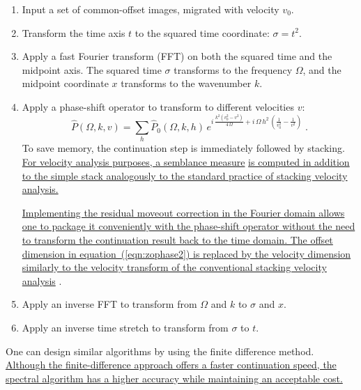 \begin{enumerate}
  \item Input a set of common-offset images, migrated with velocity $v_0$.
  \item Transform the time axis $t$ to the squared time coordinate:
    $\sigma=t^2$.
  \item Apply a fast Fourier transform (FFT) on both the squared time
    and the midpoint axis. The squared time $\sigma$ transforms to the
    frequency $\Omega$, and the midpoint coordinate $x$ transforms to
    the wavenumber $k$. 
  \item Apply a phase-shift operator to transform to different velocities $v$:
    \begin{equation}
      \label{eqn:zophase2}
      \hat{P}(\Omega,k,v) = \sum_{h} \hat{P}_0 (\Omega,k,h)\,
      e^{i\,\frac{k^2\left(v_0^2 - v^2\right)}{4\,\Omega} +
        i\,\Omega\,h^2\, \left(\frac{1}{v_0^2} -
          \frac{1}{v^2}\right)}\;.
    \end{equation}
    To save memory, the continuation step is immediately followed
    by stacking. \uline{For velocity analysis purposes, a semblance measure}
    \cite{GEO36-03-04820497} \uline{is computed in addition to the simple stack
    analogously to the standard practice of stacking velocity analysis.}
    
    \uline{Implementing the residual moveout correction in the Fourier domain allows
    one to package it conveniently with the phase-shift operator without the
    need to transform the continuation result back to the time domain. The
    offset dimension in equation~(\ref{eqn:zophase2}) is replaced by the
    velocity dimension similarly to the velocity transform of the conventional
    stacking velocity analysis} \cite{IG202-00-10012027}.

  \item Apply an inverse FFT to transform from $\Omega$ and $k$ to
    $\sigma$ and $x$.
  \item Apply an inverse time stretch to transform from $\sigma$ to $t$.
  \end{enumerate}  
  One can design similar algorithms by using the finite difference method.
  \uline{Although the finite-difference approach offers a faster continuation speed,
  the spectral algorithm has a higher accuracy while maintaining an acceptable
  cost.}

